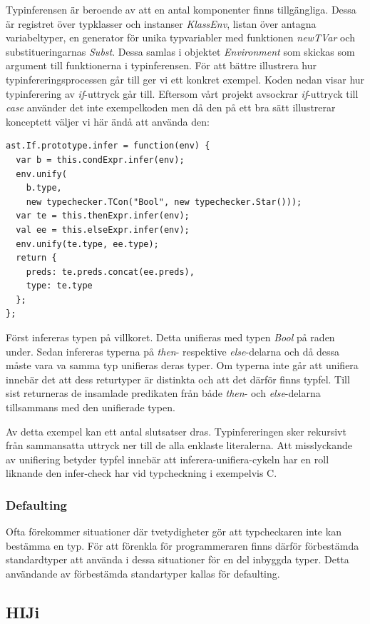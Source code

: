 Typinferensen är beroende av att en antal komponenter finns tillgängliga. Dessa är registret över typklasser och instanser \emph{KlassEnv}, listan över antagna variabeltyper, en generator för unika typvariabler med funktionen \emph{newTVar} och substitueringarnas \emph{Subst}. Dessa samlas i objektet \emph{Environment} som skickas som argument till funktionerna i typinferensen. 
För att bättre illustrera hur typinfereringsprocessen går till ger vi ett konkret exempel. Koden nedan visar hur typinferering av \emph{if}-uttryck går till. Eftersom vårt projekt avsockrar \emph{if}-uttryck till \emph{case} använder det inte exempelkoden men då den på ett bra sätt illustrerar konceptett väljer vi här ändå att använda den:

\begin{lstlisting}
ast.If.prototype.infer = function(env) {
  var b = this.condExpr.infer(env);
  env.unify(
    b.type,
    new typechecker.TCon("Bool", new typechecker.Star()));
  var te = this.thenExpr.infer(env);
  val ee = this.elseExpr.infer(env);
  env.unify(te.type, ee.type);
  return {
    preds: te.preds.concat(ee.preds),
    type: te.type
  };
};
\end{lstlisting}
Först infereras typen på villkoret. Detta unifieras med typen \emph{Bool} på raden under. Sedan infereras typerna på \emph{then}- respektive \emph{else}-delarna och då dessa måste vara va samma typ unifieras deras typer. Om typerna inte går att unifiera innebär det att dess returtyper är distinkta och att det därför finns typfel. Till sist returneras de insamlade predikaten från både \emph{then}- och \emph{else}-delarna tillsammans med den unifierade typen.

Av detta exempel kan ett antal slutsatser dras. Typinfereringen sker rekursivt från sammansatta uttryck ner till de alla enklaste literalerna. Att misslyckande av unifiering betyder typfel innebär att inferera-unifiera-cykeln har en roll liknande den infer-check har vid typcheckning i exempelvis C.

\subsubsection{Defaulting}
Ofta förekommer situationer där tvetydigheter gör att typcheckaren inte kan bestämma en typ. För att förenkla för programmeraren finns därför förbestämda standardtyper att använda i dessa situationer för en del inbyggda typer. Detta användande av förbestämda standartyper kallas för defaulting.

\subsection{HIJi}

